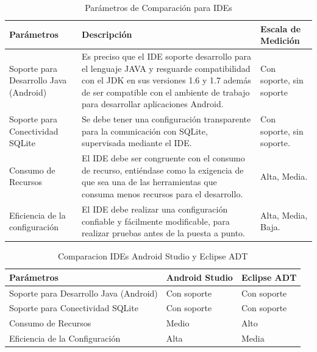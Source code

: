 \begin{table}[h]
	\begin{center}
		\begin{tabular}{|p{4.2cm}|p{4.5cm}|p{4.5cm}|}
			\hline \rowcolor[RGB]{51,153,255} 
			\textcolor{blanco}{\bf Parámetros} &
				\textcolor{blanco}{\bf Descripción} &
				\textcolor{blanco}{\bf Escala de Medición} \\
			\hline 
				Soporte para Desarrollo Java (Android) &
				Es preciso que el IDE soporte desarrollo para el lenguaje JAVA y resguarde compatibilidad con el JDK en sus versiones 1.6 y 1.7 además de ser compatible con el ambiente de trabajo para desarrollar aplicaciones Android. &
				Con soporte, sin soporte \\
      		\hline \rowcolor[RGB]{240,248,255}
      			Soporte para Conectividad SQLite &
				Se debe tener una configuración transparente para la comunicación con SQLite, supervisada mediante el IDE. &
				Con soporte, sin soporte. \\
      		\hline 
      			Consumo de Recursos &
				El IDE debe ser congruente con el consumo de recurso, entiéndase como la exigencia de que sea una de las herramientas que consuma menos recursos para el desarrollo. &
				Alta, Media. \\
      		\hline \rowcolor[RGB]{240,248,255}
      			Eficiencia de la configuración  &
				El IDE debe realizar una configuración confiable y fácilmente modificable, para realizar pruebas antes de la puesta a punto. &
				Alta, Media, Baja. \\
      		\hline 
    		\end{tabular}
	\end{center}
	\caption[Parámetros de Comparación para IDEs]{Parámetros de Comparación para IDEs} 
	\label{tab:paramIDEs}
\end{table}

\begin{table}[h]
	\begin{center}
		\begin{tabular}{|p{3cm}|p{3cm}|p{3cm}|}
			\hline \rowcolor[RGB]{51,153,255} 
			\textcolor{blanco}{\bf Parámetros} &
				\textcolor{blanco}{\bf Android Studio} &
				\textcolor{blanco}{\bf Eclipse ADT} \\
			\hline 
				Soporte para Desarrollo Java (Android) &
				Con soporte &
				Con soporte \\
      		\hline \rowcolor[RGB]{240,248,255}
      			Soporte para Conectividad SQLite &
				Con soporte &
				Con soporte \\
      		\hline 
      			Consumo de Recursos &
				Medio &
				Alto \\
      		\hline \rowcolor[RGB]{240,248,255}
      			Eficiencia de la Configuración &
				Alta &
				Media \\
      		\hline 
    		\end{tabular}
	\end{center}
	\caption[Comparacion IDEs Android Studio y Eclipse ADT]{Comparacion IDEs Android Studio y Eclipse ADT} 
	\label{tab:comIDEs}
\end{table}

